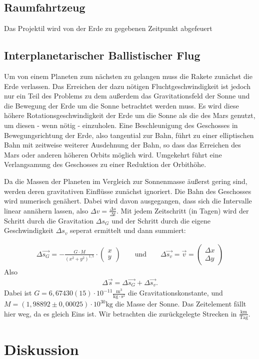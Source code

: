 \documentclass{article}
\begin{document}
 
\subsection{Raumfahrtzeug}
Das Projektil wird von der Erde zu gegebenen Zeitpunkt abgefeuert
\subsection{Interplanetarischer Ballistischer Flug}
Um von einem Planeten zum nächsten zu gelangen muss die Rakete zunächst die Erde verlassen. Das Erreichen der dazu nötigen Fluchtgeschwindigkeit ist jedoch nur ein Teil des Problems zu dem außerdem das Gravitationsfeld der Sonne und die Bewegung der Erde um die Sonne betrachtet werden muss. Es wird diese höhere Rotationsgeschwindigkeit der Erde um die Sonne als die des Mars genutzt, um diesen - wenn nötig - einzuholen. Eine Beschleunigung des Geschosses in Bewegungsrichtung der Erde, also tangential zur Bahn, führt zu einer elliptischen Bahn mit zeitweise weiterer Ausdehnung der Bahn, so dass das Erreichen des Mars oder anderen höheren Orbits möglich wird. Umgekehrt führt eine Verlangsamung des Geschosses zu einer Reduktion der Orbithöhe. 

Da die Massen der Planeten im Vergleich zur Sonnenmasse äußerst gering sind, werden deren gravitativen Einflüsse zunächst ignoriert. Die Bahn des Geschosses wird numerisch genähert. Dabei wird davon ausgegangen, dass sich die Intervalle linear annähern lassen, also $\Delta v = \frac{\Delta s}{\Delta t}$. Mit jedem Zeitschritt (in Tagen) wird der Schritt durch die Gravitation $\Delta s_G$ und der Schritt durch die eigene Geschwindigkeit $\Delta s_v$ seperat ermittelt und dann summiert:

\begin{align*}
\Delta \vec{s_G} = -\frac{G \cdot M}{(x^2 +y^2)^{1,5}} \cdot \begin{pmatrix}x \\ y\end{pmatrix} \qquad \text{und} \qquad
\Delta \vec{s_v} = \vec{v} = \begin{pmatrix} \Delta x \\ \Delta y \end{pmatrix}
\end{align*}
Also
\begin{align*}
\Delta \vec{s} = \Delta \vec{s_G} + \Delta \vec{s_v}.
\end{align*}
Dabei ist $G = 6,67430(15) \cdot 10^{-11} \frac{\text{m}^3}{\text{kg} \cdot \text{s}^2}$ die Gravitationskonstante, und $M = (1,98892 \pm 0,00025) \cdot 10^{30} \text{kg}$ die Masse der Sonne. Das Zeitelement fällt hier weg, da es gleich Eins ist. Wir betrachten die zurückgelegte Strecken in $\frac{\text{km}}{\text{Tag}}$.
 
\section{Diskussion}
\end{document}
